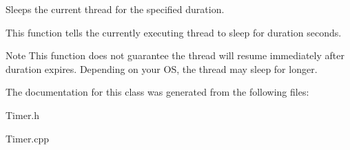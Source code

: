 Sleeps the current thread for the specified duration. 

This function tells the currently executing thread to sleep for {\ttfamily duration} seconds. \begin{DoxyNote}{Note}
This function does not guarantee the thread will resume immediately after {\ttfamily duration} expires. Depending on your O\-S, the thread may sleep for longer. 
\end{DoxyNote}


The documentation for this class was generated from the following files\-:\begin{DoxyCompactItemize}
\item 
Timer.\-h\item 
Timer.\-cpp\end{DoxyCompactItemize}
